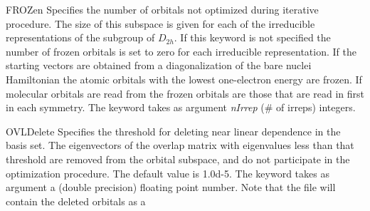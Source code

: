\begin{keywordlist}
\item[FROZen]
Specifies the number of orbitals not optimized during
iterative procedure. The size of this subspace is given for each
of the irreducible representations of the subgroup of $D_{2h}$.
If this keyword is not specified the number of frozen orbitals
is set to zero for each irreducible representation.
If the starting vectors are obtained from a diagonalization of the bare
nuclei Hamiltonian the atomic orbitals with the lowest one-{}electron energy
are frozen. If molecular orbitals are read from  the frozen
orbitals are those that are read in first in each symmetry.
The keyword takes as argument {\it nIrrep} (\# of irreps) integers.
\item[OVLDelete]
Specifies the threshold for deleting near linear dependence in the
basis set. The eigenvectors of the overlap matrix with eigenvalues
less than that threshold are removed from the orbital subspace, and
do not participate in the optimization procedure. The default value
is 1.0d-{}5.
The keyword takes as argument a (double precision) floating point number.
Note that the  file will contain the deleted orbitals as a

\end{keywordlist}
